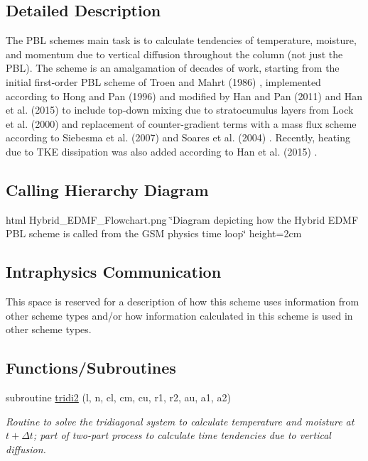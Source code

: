 \subsection{Detailed Description}
The P\+BL scheme\textquotesingle{}s main task is to calculate tendencies of temperature, moisture, and momentum due to vertical diffusion throughout the column (not just the P\+BL). The scheme is an amalgamation of decades of work, starting from the initial first-\/order P\+BL scheme of Troen and Mahrt (1986) \cite{troen_and_mahrt_1986}, implemented according to Hong and Pan (1996) \cite{hong_and_pan_1996} and modified by Han and Pan (2011) \cite{han_and_pan_2011} and Han et al. (2015) \cite{han_et_al_2015} to include top-\/down mixing due to stratocumulus layers from Lock et al. (2000) \cite{lock_et_al_2000} and replacement of counter-\/gradient terms with a mass flux scheme according to Siebesma et al. (2007) \cite{siebesma_et_al_2007} and Soares et al. (2004) \cite{soares_et_al_2004}. Recently, heating due to T\+KE dissipation was also added according to Han et al. (2015) \cite{han_et_al_2015}.\hypertarget{group___g_f_s___n_s_s_t_diagram}{}\subsection{Calling Hierarchy Diagram}\label{group___g_f_s___n_s_s_t_diagram}
html Hybrid\+\_\+\+E\+D\+M\+F\+\_\+\+Flowchart.\+png \char`\"{}\+Diagram depicting how the Hybrid E\+D\+M\+F P\+B\+L scheme is called from the G\+S\+M physics time loop\char`\"{} height=2cm \hypertarget{group___g_f_s___n_s_s_t_intraphysics}{}\subsection{Intraphysics Communication}\label{group___g_f_s___n_s_s_t_intraphysics}
This space is reserved for a description of how this scheme uses information from other scheme types and/or how information calculated in this scheme is used in other scheme types. \subsection*{Functions/\+Subroutines}
\begin{DoxyCompactItemize}
\item 
subroutine \hyperlink{group___h_e_d_m_e_f_ga80bebdc639adaba3ed0ed2ea2f24315e}{tridi2} (l, n, cl, cm, cu, r1, r2, au, a1, a2)
\begin{DoxyCompactList}\small\item\em Routine to solve the tridiagonal system to calculate temperature and moisture at $ t + \Delta t $; part of two-\/part process to calculate time tendencies due to vertical diffusion. \end{DoxyCompactList}\end{DoxyCompactItemize}
